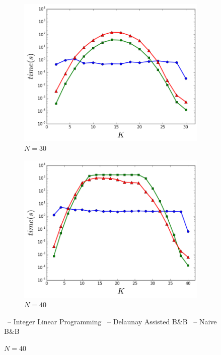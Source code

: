 \begin{figure}[t]
\begin{subfigure}[b]{0.3\linewidth}
    \includegraphics[width=0.9\linewidth]{Pictures/n30} 
    \caption{$N=30$} 
    \label{fig:fixed_n:c} 
  \end{subfigure}%
  \begin{subfigure}[b]{0.3\linewidth}
    \centering
    \includegraphics[width=0.9\linewidth]{Pictures/n40} 
    \caption{$N=40$} 
    \label{fig:fixed_n:d} 
  \end{subfigure} 
  \vspace{2ex}
  \begin{center}
  \footnotesize
  \textcolor{blue}{\cmark}\ -- Integer Linear Programming \textcolor{red}{\tmark}\ -- Delaunay Assisted B\&B \textcolor{green}{\smark}\ -- Naive B\&B
  \end{center}
\end{figure}

